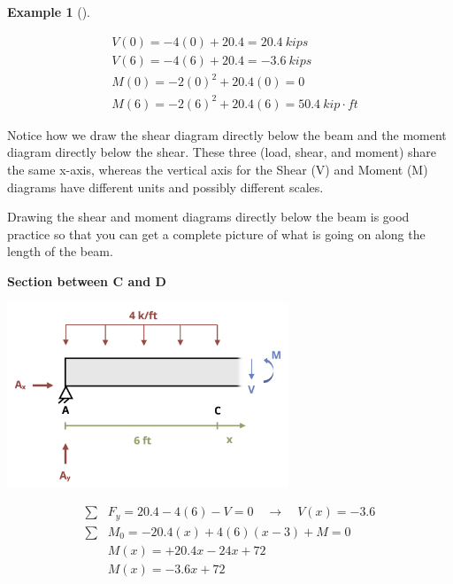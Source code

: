 \documentclass[
  letterpaper,
  DIV=11,
  numbers=noendperiod]{scrreprt}
\theoremstyle{definition}
\newtheorem{example}{Example}[chapter]
\theoremstyle{remark}
\begin{document}
\begin{tcolorbox}
\begin{example}[]
\begin{tcolorbox}
\[
\begin{aligned}
&V(0)=-4(0)+20.4=20.4{~kips} \\
&V(6)=-4(6)+20.4=-3.6{~kips}
\\
&M(0)=-2(0)^2+20.4(0)=0 \\
&M(6)=-2(6)^2+20.4(6)=50.4{~kip}\cdot{ft}
\end{aligned}
\]

Notice how we draw the shear diagram directly below the beam and the
moment diagram directly below the shear. These three (load, shear, and
moment) share the same x-axis, whereas the vertical axis for the Shear
(V) and Moment (M) diagrams have different units and possibly different
scales.

Drawing the shear and moment diagrams directly below the beam is good
practice so that you can get a complete picture of what is going on
along the length of the beam.

\textbf{Section between C and D}

\begin{center}
\includegraphics[width=3.3125in,height=\textheight]{images/CH7 PNGs/example 7.2 part 6.png}
\end{center}

\[
\begin{aligned}
\sum &F_y=20.4-4(6)-V=0 \quad\rightarrow\quad V(x)=-3.6 \\
\sum &M_0=-20.4(x)+4(6)(x-3)+M=0 \\
&M(x)=+20.4 x-24 x+72 \\
&M(x)=-3.6 x+72 \\
\end{aligned}
\]


\end{tcolorbox}
\end{example}
\end{tcolorbox}
\end{document}

